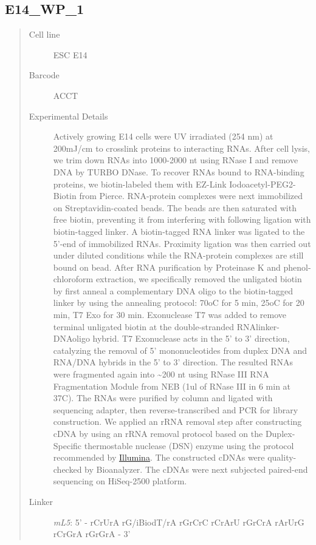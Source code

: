\documentclass[letterpaper,10pt,english]{sphinxmanual}
\begin{document}
\subsection{E14\_WP\_1}
\label{Data_Resources:e14-wp-1}\begin{quote}\begin{description}
\item[{Cell line}] \leavevmode
ESC E14

\item[{Barcode}] \leavevmode
ACCT

\item[{Experimental Details}] \leavevmode
Actively growing E14 cells were UV irradiated (254 nm) at 200mJ/cm
to crosslink proteins to interacting RNAs. After cell lysis, we trim down RNAs into
1000-2000 nt using RNase I and remove DNA by TURBO DNase. To recover RNAs bound to
RNA-binding proteins, we biotin-labeled them with EZ-Link Iodoacetyl-PEG2-Biotin from
Pierce. RNA-protein complexes were next immobilized on Streptavidin-coated beads. The
beads are then saturated with free biotin, preventing it from interfering with following
ligation with biotin-tagged linker. A biotin-tagged RNA linker was ligated to the 5’-end
of immobilized RNAs. Proximity ligation was then carried out under diluted conditions
while the RNA-protein complexes are still bound on bead. After RNA purification by
Proteinase K and phenol-chloroform extraction, we specifically removed the unligated
biotin by first anneal a complementary DNA oligo to the biotin-tagged linker by using
the annealing protocol: 70oC for 5 min, 25oC for 20 min, T7 Exo for 30 min. Exonuclease
T7 was added to remove terminal unligated biotin at the double-stranded RNAlinker-DNAoligo
hybrid. T7 Exonuclease acts in the 5' to 3' direction, catalyzing the removal of 5'
mononucleotides from duplex DNA and RNA/DNA hybrids in the 5’ to 3’ direction. The resulted
RNAs were fragmented again into \textasciitilde{}200 nt using RNase III RNA Fragmentation Module from NEB
(1ul of RNase III in 6 min at 37C). The RNAs were purified by column and ligated with
sequencing adapter, then reverse-transcribed and PCR for library construction. We applied
an rRNA removal step after constructing cDNA by using an rRNA removal protocol based on
the Duplex-Specific thermostable nuclease (DSN) enzyme using the protocol recommended by
\href{http://supportres.illumina.com/documents/myillumina/7836bd3e-3358-4834-b2f7-80f80acb4e3f/dsn\_normalization\_sampleprep\_application\_note\_15014673\_c.pdf}{Illumina}.
The constructed cDNAs were quality-checked by Bioanalyzer. The cDNAs were next
subjected paired-end sequencing on HiSeq-2500 platform.

\item[{Linker}] \leavevmode
\emph{mL5}: 5' - rCrUrA rG/iBiodT/rA rGrCrC rCrArU rGrCrA rArUrG rCrGrA rGrGrA - 3'

\end{description}\end{quote}
\end{document}
